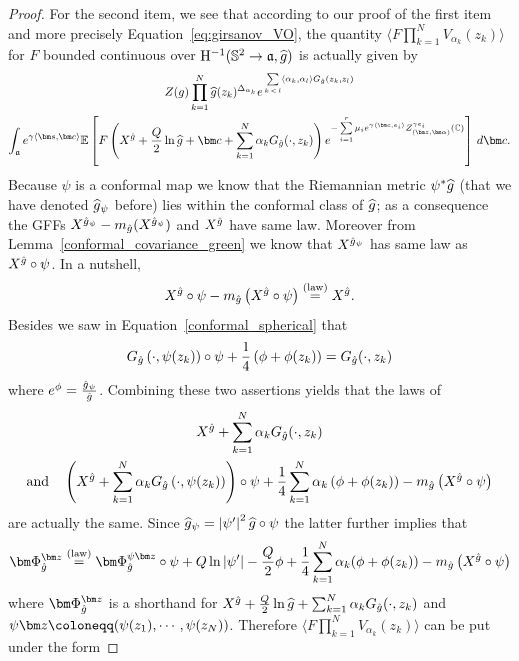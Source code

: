 \documentclass[10pt]{amsart}
\theoremstyle{definition}\newtheorem{defi}[theo]{Definition}\newtheorem{rema}[theo]{Remark}\newtheorem{exam}[theo]{Example}\newtheorem{exem}[theo]{Example}\newtheorem{nota}[theo]{Notation}
\newcommand{\frka}{\mathfrak{a}}
\newcommand{\rmH}{\mathrm{H}}
\newcommand{\C}{\mathbb{C}}
\renewcommand*\S{\mathbb{S}}
\newcommand{\E}{\mathbb{E}}
\newcommand{\eqlaw}{\overset{\text{(law)}}{=}}
\newcommand{\ps}[1]{\langle #1 \rangle}
\newcommand{\norm}[1]{\left\lvert#1\right\rvert}
\let\oldhat\hat
\renewcommand*{\hat}[1]{\mathchoice{\widehat{#1}}{\widehat{#1}}{\oldhat{#1}}{\oldhat{#1}}}
\begin{document}
\begin{proof}
For the second item, we see that according to our proof of the first item and more precisely Equation~\eqref{eq:girsanov_VO}, the quantity $\ps{F\prod_{k=1}^NV_{\alpha_k}(z_k)}$ for $F$ bounded continuous over $\rmH^{-1}(\S^2\to\frka,\hat g)$ is actually given by
\begin{multline*}
Z(g)\prod_{k=1}^N \hat g (z_k)^{\Delta_{\alpha_k}}e^{\, \sum\limits_{k\,<\,l} \langle\alpha_k,\alpha_l \rangle G_{\hat g}(z_k,z_l) }\\
\int_{ \frka} e^{\gamma \ps{\bm s,\bm c}}\E \left [F\left(X^{\hat g}+\frac Q2\ln\hat g+\bm c+\sum\limits_{k=1}^N\alpha_kG_{\hat g}(\cdot,z_k)\right)e^{- \sum\limits_{i=1}^{r} \mu_i e^{\gamma \langle \bm c,e_i\rangle }Z_{(\bm z,\bm \alpha)}^{\gamma e_i} (\C)} \right]\,d\bm c.
\end{multline*}
Because $\psi$ is a conformal map we know that the Riemannian metric $\psi^*\hat g$ (that we have denoted $\hat{g}_\psi$ before) lies within the conformal class of $\hat g$; as a consequence the GFFs $X^{\hat g_\psi}-m_{\hat g}(X^{\hat g_\psi})$ and $X^{\hat g}$ have same law. Moreover from Lemma~\ref{conformal_covariance_green} we know that $X^{\hat g_\psi}$ has same law as $X^{\hat g}\circ\psi$. In a nutshell,
\[
X^{\hat g}\circ\psi-m_{\hat g}\left(X^{\hat g}\circ\psi\right)\eqlaw X^{\hat g}.
\]
Besides we saw in Equation~\eqref{conformal_spherical} that
\[
G_{\hat g}\left(\cdot,\psi(z_k)\right)\circ\psi+\frac14\left(\phi+\phi(z_k)\right)=G_{\hat g}(\cdot,z_k)
\]
where $e^{\phi}=\frac{\hat g_\psi}{\hat g}$. Combining these two assertions yields that the laws of
\begin{multline*}
X^{\hat g}+\sum_{k=1}^N\alpha_kG_{\hat g}(\cdot,z_k)\\
\text{and}\quad\left(X^{\hat g}+\sum_{k=1}^N\alpha_kG_{\hat g}\left(\cdot,\psi(z_k)\right)\right)\circ\psi+\frac14\sum_{k=1}^N\alpha_k\left(\phi+\phi(z_k)\right)-m_{\hat g}\left(X^{\hat g}\circ\psi\right)
\end{multline*}
are actually the same. Since $\hat g_\psi=\norm{\psi'}^2\hat g\circ\psi$ the latter further implies that
\[
\bm\Phi_{\hat g}^{\bm z}\eqlaw \bm\Phi_{\hat g}^{\psi\bm z}\circ\psi+ Q\ln\norm{\psi'}-\frac Q2\phi+\frac14\sum_{k=1}^N\alpha_k(\phi+\phi(z_k))-m_{\hat g}\left(X^{\hat g}\circ\psi\right)
\]
where $\bm\Phi_{\hat g}^{\bm z}$ is a shorthand for $X^{\hat g}+\frac Q2\ln\hat g+\sum_{k=1}^N\alpha_kG_{\hat g}(\cdot,z_k)$ and $\psi\bm z\coloneqq (\psi(z_1),\cdots,\linebreak\psi(z_N))$. Therefore $\ps{F\prod_{k=1}^NV_{\alpha_k}(z_k)}$ can be put under the form

\end{proof}
\end{document}
